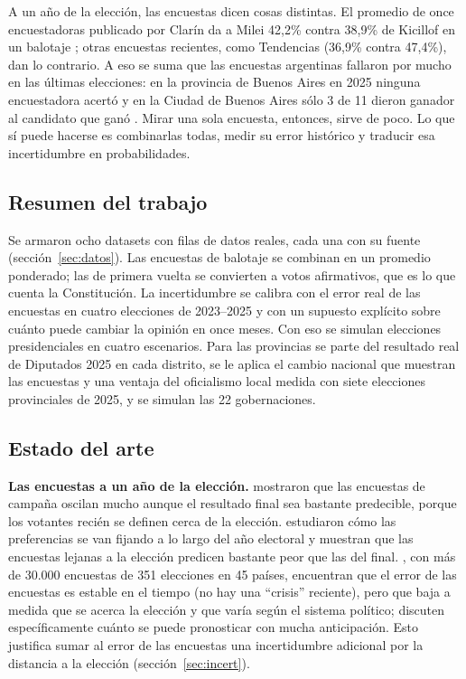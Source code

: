\documentclass{article}
\begin{document}
A un año de la elección, las encuestas dicen cosas distintas. El promedio de
once encuestadoras publicado por Clarín da a Milei 42,2\% contra 38,9\% de
Kicillof en un balotaje \cite{clarin2026}; otras encuestas recientes, como
Tendencias (36,9\% contra 47,4\%), dan lo contrario. A eso se suma que las
encuestas argentinas fallaron por mucho en las últimas elecciones: en la
provincia de Buenos Aires en 2025 ninguna encuestadora acertó
\cite{chequeadopba2025} y en la Ciudad de Buenos Aires sólo 3 de 11 dieron
ganador al candidato que ganó \cite{chequeadocaba2025}. Mirar una sola encuesta,
entonces, sirve de poco. Lo que sí puede hacerse es combinarlas todas, medir su
error histórico y traducir esa incertidumbre en probabilidades.

\subsection{Resumen del trabajo}

Se armaron ocho datasets con \nFilasDatos{} filas de datos reales, cada una con su fuente
(sección~\ref{sec:datos}). Las encuestas de balotaje se combinan en un promedio
ponderado; las de primera vuelta se convierten a votos afirmativos, que es lo que
cuenta la Constitución. La incertidumbre se calibra con el error real de las
encuestas en cuatro elecciones de 2023--2025 y con un supuesto explícito sobre
cuánto puede cambiar la opinión en once meses. Con eso se simulan \nSim{}
elecciones presidenciales en cuatro escenarios. Para las provincias se parte del
resultado real de Diputados 2025 en cada distrito, se le aplica el cambio
nacional que muestran las encuestas y una ventaja del oficialismo local medida
con siete elecciones provinciales de 2025, y se simulan las 22 gobernaciones.

\subsection{Estado del arte}

\textbf{Las encuestas a un año de la elección.} \citet{gelman1993} mostraron
que las encuestas de campaña oscilan mucho aunque el resultado final sea
bastante predecible, porque los votantes recién se definen cerca de la elección.
\citet{erikson2012} estudiaron cómo las preferencias se van fijando a lo largo
del año electoral y muestran que las encuestas lejanas a la elección predicen
bastante peor que las del final. \citet{jennings2018}, con más de 30.000
encuestas de 351 elecciones en 45 países, encuentran que el error de las
encuestas es estable en el tiempo (no hay una ``crisis'' reciente), pero que
baja a medida que se acerca la elección y que varía según el sistema político;
\citet{jennings2020} discuten específicamente cuánto se puede pronosticar con
mucha anticipación. Esto justifica sumar al error de las encuestas una
incertidumbre adicional por la distancia a la elección (sección~\ref{sec:incert}).
\end{document}
